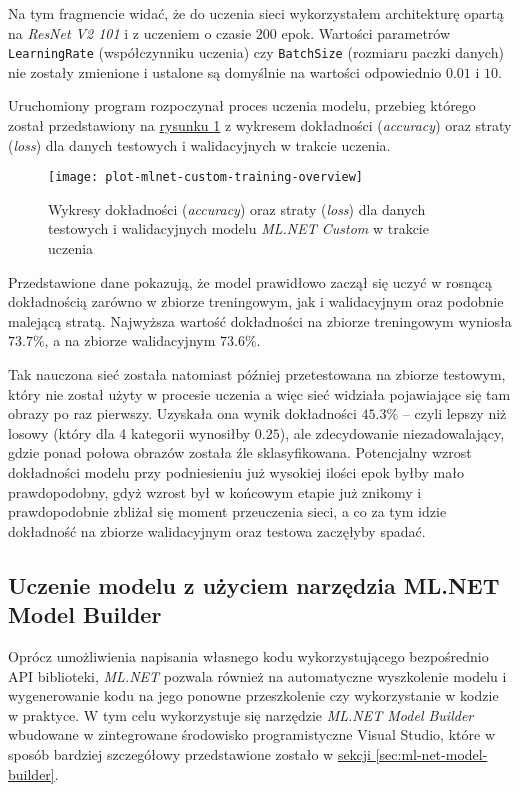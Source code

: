 Na tym fragmencie widać, że do uczenia sieci wykorzystałem architekturę opartą na \emph{ResNet V2 101} i z uczeniem o czasie $200$ epok.
Wartości parametrów \lstinline{LearningRate} (współczynniku uczenia) czy \lstinline{BatchSize} (rozmiaru paczki danych) nie zostały zmienione i ustalone są domyślnie na wartości odpowiednio $0.01$ i $10$.

Uruchomiony program rozpoczynał proces uczenia modelu, przebieg którego został przedstawiony na \hyperref[fig:plot-mlnet-custom-training-overview]{rysunku \ref*{fig:plot-mlnet-custom-training-overview}} z wykresem dokładności (\emph{accuracy}) oraz straty (\emph{loss}) dla danych testowych i walidacyjnych w trakcie uczenia.

\begin{figure}[ht]
  \texttt{[image: plot-mlnet-custom-training-overview]}
  \caption[Wykresy statystyk modelu ML.NET Custom w trakcie uczenia]{Wykresy dokładności (\emph{accuracy}) oraz straty (\emph{loss}) dla danych testowych i walidacyjnych modelu \emph{ML.NET Custom} w trakcie uczenia}
  \label{fig:plot-mlnet-custom-training-overview}
\end{figure}

Przedstawione dane pokazują, że model prawidłowo zaczął się uczyć w rosnącą dokładnością zarówno w zbiorze treningowym, jak i walidacyjnym oraz podobnie malejącą stratą.
Najwyższa wartość dokładności na zbiorze treningowym wyniosła $73.7\%$, a na zbiorze walidacyjnym $73.6\%$.

Tak nauczona sieć została natomiast później przetestowana na zbiorze testowym, który nie został użyty w procesie uczenia a więc sieć widziała pojawiające się tam obrazy po raz pierwszy.
Uzyskała ona wynik dokładności $45.3\%$ -- czyli lepszy niż losowy (który dla 4 kategorii wynosiłby $0.25$), ale zdecydowanie niezadowalający, gdzie ponad połowa obrazów została źle sklasyfikowana.
Potencjalny wzrost dokładności modelu przy podniesieniu już wysokiej ilości epok byłby mało prawdopodobny, gdyż wzrost był w końcowym etapie już znikomy i prawdopodobnie zbliżał się moment przeuczenia sieci, a co za tym idzie dokładność na zbiorze walidacyjnym oraz testowa zaczęłyby spadać.

\subsection{Uczenie modelu z użyciem narzędzia ML.NET Model Builder}

Oprócz umożliwienia napisania własnego kodu wykorzystującego bezpośrednio API biblioteki, \emph{ML.NET} pozwala również na automatyczne wyszkolenie modelu i wygenerowanie kodu na jego ponowne przeszkolenie czy wykorzystanie w kodzie w praktyce.
W tym celu wykorzystuje się narzędzie \emph{ML.NET Model Builder} wbudowane w zintegrowane środowisko programistyczne Visual Studio, które w sposób bardziej szczegółowy przedstawione zostało w \hyperref[sec:ml-net-model-builder]{sekcji \ref*{sec:ml-net-model-builder}}.


